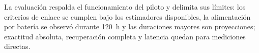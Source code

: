 La evaluación respalda el funcionamiento del piloto y delimita sus límites: los criterios de enlace se cumplen bajo los estimadores disponibles, la alimentación por batería se observó durante 120~h y las duraciones mayores son proyecciones; exactitud absoluta, recuperación completa y latencia quedan para mediciones directas.
